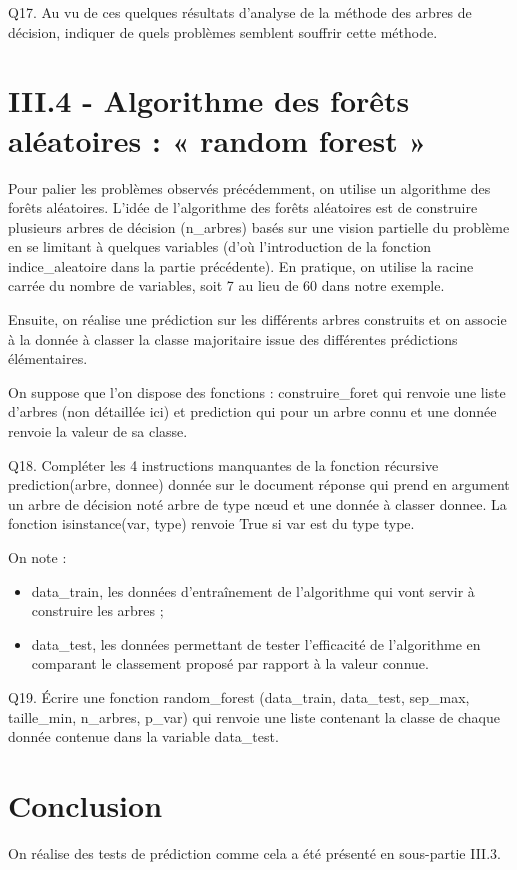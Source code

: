\documentclass[10pt]{article}
\begin{document}
Q17. Au vu de ces quelques résultats d'analyse de la méthode des arbres de décision, indiquer de quels problèmes semblent souffrir cette méthode.

\section{III.4 - Algorithme des forêts aléatoires : « random forest »}
Pour palier les problèmes observés précédemment, on utilise un algorithme des forêts aléatoires. L'idée de l'algorithme des forêts aléatoires est de construire plusieurs arbres de décision (n\_arbres) basés sur une vision partielle du problème en se limitant à quelques variables (d'où l'introduction de la fonction indice\_aleatoire dans la partie précédente). En pratique, on utilise la racine carrée du nombre de variables, soit 7 au lieu de 60 dans notre exemple.

Ensuite, on réalise une prédiction sur les différents arbres construits et on associe à la donnée à classer la classe majoritaire issue des différentes prédictions élémentaires.

On suppose que l'on dispose des fonctions : construire\_foret qui renvoie une liste d'arbres (non détaillée ici) et prediction qui pour un arbre connu et une donnée renvoie la valeur de sa classe.

Q18. Compléter les 4 instructions manquantes de la fonction récursive prediction(arbre, donnee) donnée sur le document réponse qui prend en argument un arbre de décision noté arbre de type nœud et une donnée à classer donnee. La fonction isinstance(var, type) renvoie True si var est du type type.

On note :

\begin{itemize}
  \item data\_train, les données d'entraînement de l'algorithme qui vont servir à construire les arbres ;

  \item data\_test, les données permettant de tester l'efficacité de l'algorithme en comparant le classement proposé par rapport à la valeur connue.

\end{itemize}
Q19. Écrire une fonction random\_forest (data\_train, data\_test, sep\_max, taille\_min, n\_arbres, p\_var) qui renvoie une liste contenant la classe de chaque donnée contenue dans la variable data\_test.

\section{Conclusion}
On réalise des tests de prédiction comme cela a été présenté en sous-partie III.3.
\end{document}
